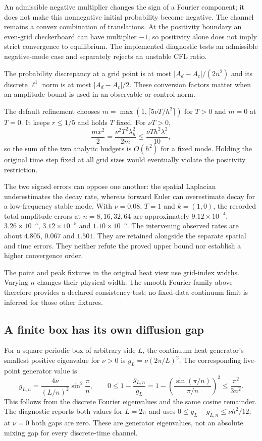 An admissible negative multiplier changes the sign of a Fourier component;
it does not make this nonnegative initial probability become negative.
The channel remains a convex combination of translations. At the
positivity boundary an even-grid checkerboard can have multiplier $-1$,
so positivity alone does not imply strict convergence to equilibrium.
The implemented diagnostic tests an admissible negative-mode case and
separately rejects an unstable CFL ratio.

The probability discrepancy at a grid point is at most
$|A_d-A_c|/(2n^2)$ and its discrete $\ell^1$ norm is at most
$|A_d-A_c|/2$. These conversion factors matter when an amplitude bound
is used in an observable or control norm.

The default refinement chooses
$m=\max(1,\lceil5\nu T/h^2\rceil)$ for $T>0$ and $m=0$ at $T=0$.
It keeps $r\le1/5$ and holds $T$ fixed. For $\nu T>0$,
\[
 \frac{mx^2}{2}
 =\frac{\nu^2T^2\lambda_h^2}{2m}
 \le\frac{\nu T h^2\lambda^2}{10},
\]
so the sum of the two analytic budgets is $O(h^2)$ for a fixed mode.
Holding the original time step fixed at all grid sizes would eventually
violate the positivity restriction.

The two signed errors can oppose one another: the spatial Laplacian
underestimates the decay rate, whereas forward Euler can overestimate
decay for a low-frequency stable mode. With $\nu=0.08$, $T=1$ and
$k=(1,0)$, the recorded total amplitude errors at
$n=8,16,32,64$ are approximately
$9.12\times10^{-4}$, $3.26\times10^{-5}$,
$3.12\times10^{-5}$ and $1.10\times10^{-5}$.
The intervening observed rates are about $4.805$, $0.067$ and $1.501$.
They are retained alongside the separate spatial and time errors.
They neither refute the proved upper bound nor establish a higher
convergence order.

The point and peak fixtures in the original heat view use grid-index
widths. Varying $n$ changes their physical width. The smooth Fourier
family above therefore provides a declared consistency test; no
fixed-data continuum limit is inferred for those other fixtures.

\subsection{A finite box has its own diffusion gap}

For a square periodic box of arbitrary side $L$, the continuum heat
generator's smallest positive eigenvalue for $\nu>0$ is
$g_L=\nu(2\pi/L)^2$. The corresponding five-point generator value is
\[
 g_{L,n}=\frac{4\nu}{(L/n)^2}\sin^2\frac{\pi}{n},\qquad
 0\le1-\frac{g_{L,n}}{g_L}
     =1-\left(\frac{\sin(\pi/n)}{\pi/n}\right)^2
     \le\frac{\pi^2}{3n^2}.
\]
This follows from the discrete Fourier eigenvalues and the same cosine
remainder. The diagnostic reports both values for $L=2\pi$ and uses
$0\le g_L-g_{L,n}\le\nu h^2/12$; at $\nu=0$ both gaps are zero.
These are generator eigenvalues, not an absolute mixing gap for every
discrete-time channel.

